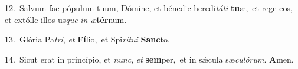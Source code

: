 {\numbfont\textcolor{\numbcolor}{12.}}~Salvum fac pópulum tuum, Dómine, et bénedic heredi\-\textit{tá}\-\textit{ti} \textbf{tu}\-æ,~\star et rege eos, et extólle illos us\textit{que} \textit{in} \textit{æ}\-\textbf{tér}num.\par
{\numbfont\textcolor{\numbcolor}{13.}}~Glória Pa\-\textit{tri}\-, \textit{et} \textbf{Fí}\-lio,~\star et Spi\-\textit{rí}\-\textit{tu}\textit{i} \textbf{Sanc}\-to.\par
{\numbfont\textcolor{\numbcolor}{14.}}~Sicut erat in princípio, et \textit{nunc}\-, \textit{et} \textbf{sem}\-per,~\star et in sǽcula sæ\-\textit{cu}\-\textit{ló}\textit{rum}. \textbf{A}\-men.\par
